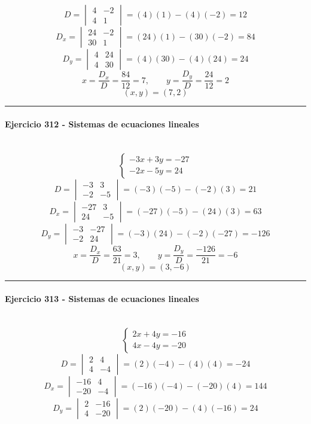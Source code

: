 \documentclass[10pt,a4paper]{article}
\newcommand{\res}[1]{\paragraph{#1}\mbox{}\\[-1.2em]}
\begin{document}
\[ D=\begin{vmatrix}4&-2\\4&1\end{vmatrix}=(4)(1)-(4)(-2)=12 \]
\[ D_x=\begin{vmatrix}24&-2\\30&1\end{vmatrix}=(24)(1)-(30)(-2)=84 \]
\[ D_y=\begin{vmatrix}4&24\\4&30\end{vmatrix}=(4)(30)-(4)(24)=24 \]
\[ x=\frac{D_x}{D}=\frac{84}{12}=7,\qquad y=\frac{D_y}{D}=\frac{24}{12}=2 \]
\[ \boxed{(x,y)=(7,2)} \]
\vspace{1mm}\hrule\vspace{2mm}
\res{Ejercicio 312 - Sistemas de ecuaciones lineales}
\[ \begin{cases}- 3 x + 3 y=-27\\- 2 x - 5 y=24\end{cases} \]
\[ D=\begin{vmatrix}-3&3\\-2&-5\end{vmatrix}=(-3)(-5)-(-2)(3)=21 \]
\[ D_x=\begin{vmatrix}-27&3\\24&-5\end{vmatrix}=(-27)(-5)-(24)(3)=63 \]
\[ D_y=\begin{vmatrix}-3&-27\\-2&24\end{vmatrix}=(-3)(24)-(-2)(-27)=-126 \]
\[ x=\frac{D_x}{D}=\frac{63}{21}=3,\qquad y=\frac{D_y}{D}=\frac{-126}{21}=-6 \]
\[ \boxed{(x,y)=(3,-6)} \]
\vspace{1mm}\hrule\vspace{2mm}
\res{Ejercicio 313 - Sistemas de ecuaciones lineales}
\[ \begin{cases}2 x + 4 y=-16\\4 x - 4 y=-20\end{cases} \]
\[ D=\begin{vmatrix}2&4\\4&-4\end{vmatrix}=(2)(-4)-(4)(4)=-24 \]
\[ D_x=\begin{vmatrix}-16&4\\-20&-4\end{vmatrix}=(-16)(-4)-(-20)(4)=144 \]
\[ D_y=\begin{vmatrix}2&-16\\4&-20\end{vmatrix}=(2)(-20)-(4)(-16)=24 \]
\end{document}
